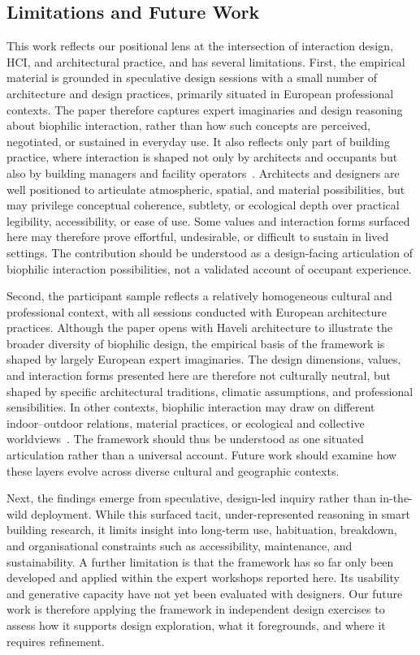 \subsection{Limitations and Future Work}
\label{subsec:ch5-limitations}
This work reflects our positional lens at the intersection of interaction design, HCI, and architectural practice, and has several limitations. First, the empirical material is grounded in speculative design sessions with a small number of architecture and design practices, primarily situated in European professional contexts. The paper therefore captures expert imaginaries and design reasoning about biophilic interaction, rather than how such concepts are perceived, negotiated, or sustained in everyday use. It also reflects only part of building practice, where interaction is shaped not only by architects and occupants but also by building managers and facility operators~\cite{mitchell2020no}. Architects and designers are well positioned to articulate atmospheric, spatial, and material possibilities, but may privilege conceptual coherence, subtlety, or ecological depth over practical legibility, accessibility, or ease of use. Some values and interaction forms surfaced here may therefore prove effortful, undesirable, or difficult to sustain in lived settings. The contribution should be understood as a design-facing articulation of biophilic interaction possibilities, not a validated account of occupant experience.

Second, the participant sample reflects a relatively homogeneous cultural and professional context, with all sessions conducted with European architecture practices. Although the paper opens with Haveli architecture to illustrate the broader diversity of biophilic design, the empirical basis of the framework is shaped by largely European expert imaginaries. The design dimensions, values, and interaction forms presented here are therefore not culturally neutral, but shaped by specific architectural traditions, climatic assumptions, and professional sensibilities. In other contexts, biophilic interaction may draw on different indoor–outdoor relations, material practices, or ecological and collective worldviews~\cite{rao2025designing}. The framework should thus be understood as one situated articulation rather than a universal account. Future work should examine how these layers evolve across diverse cultural and geographic contexts.

Next, the findings emerge from speculative, design-led inquiry rather than in-the-wild deployment. While this surfaced tacit, under-represented reasoning in smart building research, it limits insight into long-term use, habituation, breakdown, and organisational constraints such as accessibility, maintenance, and sustainability. A further limitation is that the framework has so far only been developed and applied within the expert workshops reported here. Its usability and generative capacity have not yet been evaluated with designers. Our future work is therefore applying the framework in independent design exercises to assess how it supports design exploration, what it foregrounds, and where it requires refinement.

